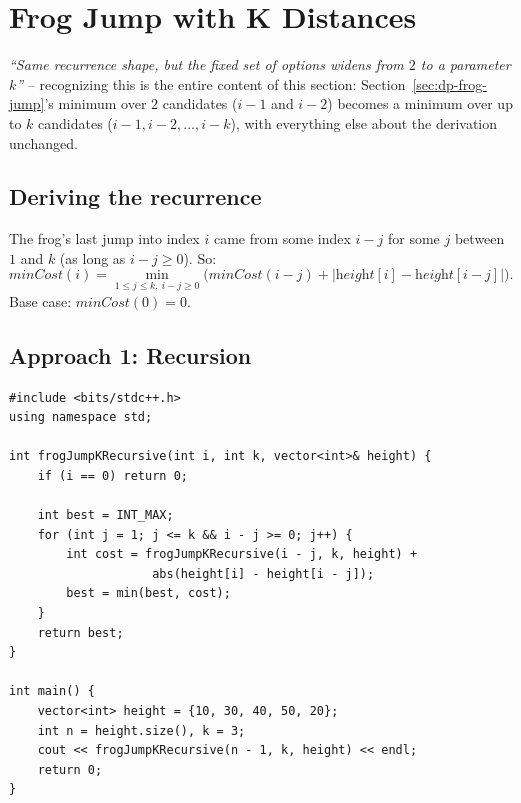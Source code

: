 \section{Frog Jump with K Distances}
\label{sec:dp-frog-jump-k}


\begin{patternbox}
\emph{``Same recurrence shape, but the fixed set of options widens from
$2$ to a parameter $k$''} -- recognizing this is the entire content of
this section: Section~\ref{sec:dp-frog-jump}'s minimum over $2$ candidates
($i-1$ and $i-2$) becomes a minimum over up to $k$ candidates
($i-1, i-2, \ldots, i-k$), with everything else about the derivation
unchanged.
\end{patternbox}

\subsection*{Deriving the recurrence}

The frog's last jump into index $i$ came from some index $i-j$ for some
$j$ between $1$ and $k$ (as long as $i-j \ge 0$). So:
\[
  \textit{minCost}(i) = \min_{1 \le j \le k,\ i-j \ge 0}
  \Big(\textit{minCost}(i-j) + |\textit{height}[i]-\textit{height}[i-j]|\Big).
\]
Base case: $\textit{minCost}(0)=0$.

\subsection*{Approach 1: Recursion}

\begin{lstlisting}
#include <bits/stdc++.h>
using namespace std;

int frogJumpKRecursive(int i, int k, vector<int>& height) {
    if (i == 0) return 0;

    int best = INT_MAX;
    for (int j = 1; j <= k && i - j >= 0; j++) {
        int cost = frogJumpKRecursive(i - j, k, height) +
                    abs(height[i] - height[i - j]);
        best = min(best, cost);
    }
    return best;
}

int main() {
    vector<int> height = {10, 30, 40, 50, 20};
    int n = height.size(), k = 3;
    cout << frogJumpKRecursive(n - 1, k, height) << endl;
    return 0;
}
\end{lstlisting}

